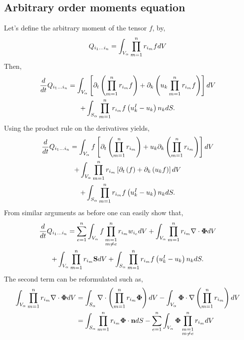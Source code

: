\subsection*{Arbitrary order moments equation}

Let's define the arbitrary moment of the tensor $f$, by, 
\begin{equation*}
    Q_{i_1\ldots i_n}
    = \int_{V_\alpha} 
    \prod_{m=1}^{n} r_{i_m} f dV
\end{equation*}
Then,
\begin{multline*}
    \frac{d}{d t} Q_{i_1\ldots i_n}
    =\int_{V_\alpha} \left[ \partial_t \left(\prod_{m=1}^{n} r_{i_m}f\right) 
    + \partial_k \left(u_k \prod_{m=1}^{n} r_{i_m}f\right) \right]dV\\
    +\int_{S_\alpha} \prod_{m=1}^{n} r_{i_m} f \left(u^I_k - u_k\right) n_k dS.
\end{multline*}
Using the product rule on the derivatives yields, 
\begin{multline*}
    \frac{d}{d t} Q_{i_1\ldots i_n}
    =\int_{V_\alpha} f \left[ \partial_t \left(\prod_{m=1}^{n} r_{i_m}\right) 
    + u_k \partial_k \left( \prod_{m=1}^{n} r_{i_m}\right) \right]dV\\
    +\int_{V_\alpha} \prod_{m=1}^{n} r_{i_m} \left[ \partial_t \left(f\right) 
    +  \partial_k \left(u_k f \right) \right]dV\\
    +\int_{S_\alpha} \prod_{m=1}^{n} r_{i_m} f \left(u^I_k - u_k\right) n_k dS.
\end{multline*}
From similar arguments as before one can easily show that, 
\begin{multline*}
    \frac{d}{d t} Q_{i_1\ldots i_n}
    = \sum_{e=1}^{n} \int_{V_\alpha} f  \prod^{n}_{\substack{ m=1 \\   m \neq e}} r_{i_m} w_{i_e}dV
    +\int_{V_\alpha} \prod_{m=1}^{n} r_{i_m} \mathbf{\nabla}\cdot\mathbf{\Phi} dV\\
    + \int_{V_\alpha} \prod_{m=1}^{n} r_{i_m} \textbf{S} dV
    +\int_{S_\alpha} \prod_{m=1}^{n} r_{i_m} f \left(u^I_k - u_k\right) n_k dS.
\end{multline*}
The second term can be reformulated such as,
\begin{align*}
    \int_{V_\alpha} \prod_{m=1}^{n} r_{i_m} \mathbf{\nabla}\cdot\mathbf{\Phi} dV
    &= \int_{S_\alpha} \mathbf{\nabla} \cdot \left(\prod_{m=1}^{n} r_{i_m} \mathbf{\Phi} \right)dV
    - \int_{V_\alpha} \mathbf{\Phi} \cdot \mathbf{\nabla} \left(\prod_{m=1}^{n} r_{i_m} \right)dV\\
    &= \int_{S_\alpha} \prod_{m=1}^{n} r_{i_m} \mathbf{\Phi} \cdot \textbf{n}dS
    -\sum_{e=1}^{n} \int_{V_\alpha} \mathbf{\Phi}  \prod^{n}_{\substack{ m=1 \\m \neq e}} r_{i_m}  dV
\end{align*}
